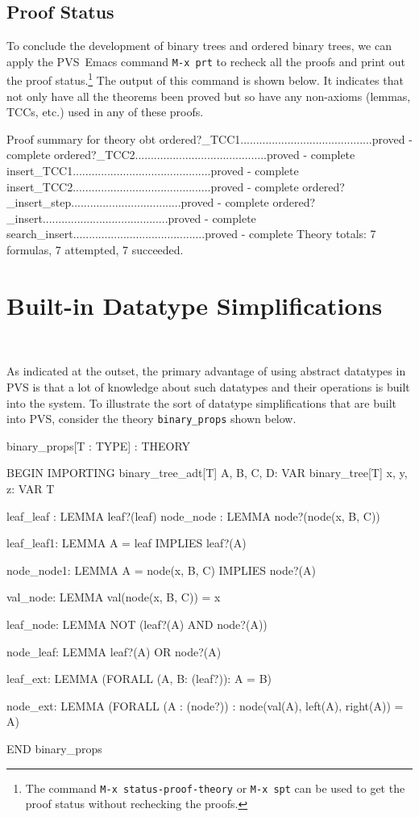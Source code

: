 \documentclass[11pt,twoside]{book}
\begin{document}
\section{Proof Status}

To conclude the development of binary trees and ordered binary trees,  we
can apply the PVS~Emacs command \texttt{M-x prt} to recheck all 
the proofs and print out the proof status.\footnote{The command
\texttt{M-x status-proof-theory} or \texttt{M-x spt} can be used to get the proof
status without rechecking the proofs.}  The output of this command is
shown below.  It indicates that not only have all the theorems been
proved but so have any non-axioms (lemmas, TCCs, etc.)  used
in any of these proofs.   
\begin{session*}
Proof summary for theory obt
    ordered?_TCC1..........................................proved - complete
    ordered?_TCC2..........................................proved - complete
    insert_TCC1............................................proved - complete
    insert_TCC2............................................proved - complete
    ordered?_insert_step...................................proved - complete
    ordered?_insert........................................proved - complete
    search_insert..........................................proved - complete
    Theory totals: 7 formulas, 7 attempted, 7 succeeded.
\end{session*}


\chapter{Built-in Datatype Simplifications}~\label{built-in}

As indicated at the outset, the primary advantage of using abstract
datatypes in PVS is that a lot of knowledge about such datatypes and
their operations is built into the system.  To illustrate
the sort of datatype simplifications that are built into PVS,
consider the theory \texttt{binary\_props} shown below.
\begin{session*}
binary_props[T : TYPE] : THEORY

  BEGIN
  IMPORTING binary_tree_adt[T]
  A, B, C, D: VAR binary_tree[T]
  x, y, z: VAR T

  leaf_leaf : LEMMA leaf?(leaf)
  node_node : LEMMA node?(node(x, B, C))

  leaf_leaf1: LEMMA A = leaf IMPLIES leaf?(A)

  node_node1: LEMMA A = node(x, B, C) IMPLIES node?(A)

  val_node: LEMMA val(node(x, B, C)) = x

  leaf_node: LEMMA NOT (leaf?(A) AND node?(A))

  node_leaf: LEMMA leaf?(A) OR node?(A)

  leaf_ext: LEMMA (FORALL (A, B: (leaf?)): A = B)
         
  node_ext:  LEMMA (FORALL (A : (node?)) : 
                    node(val(A), left(A), right(A)) = A)

  END binary_props
\end{session*}
\end{document}
